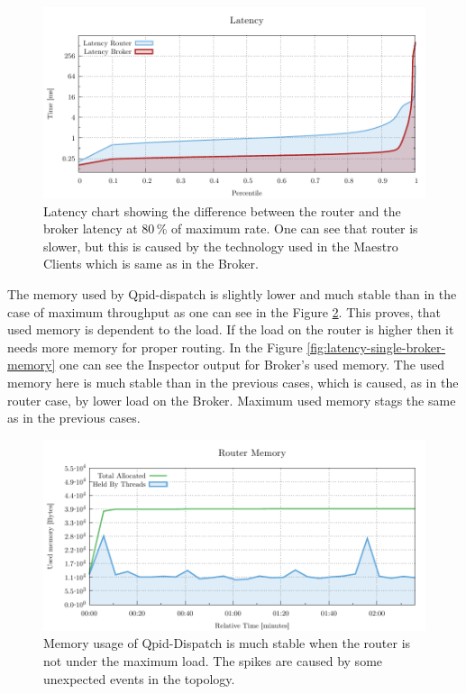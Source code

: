 \begin{figure}[H]
	\centering
	\includegraphics[width=1\linewidth]{obrazky-figures/charts/singlepoint-latency.pdf}
	\caption{Latency chart showing the difference between the router and the broker latency at 80\,\% of maximum rate. One can see that router is slower, but this is caused by the technology used in the Maestro Clients which is same as in the Broker.}
	\label{fig:latency-single-router}
\end{figure}

The memory used by Qpid-dispatch is slightly lower and much stable than in the case of maximum throughput as one can see in the Figure \ref{fig:latency-single-router-memory}. This proves, that used memory is dependent to the load. If the load on the router is higher then it needs more memory for proper routing. In the Figure \ref{fig:latency-single-broker-memory} one can see the Inspector output for Broker's used memory. The used memory here is much stable than in the previous cases, which is caused, as in the router case, by lower load on the Broker. Maximum used memory stags the same as in the previous cases.

\begin{figure}[H]
	\centering
	\includegraphics[width=1\linewidth]{obrazky-figures/charts/singlepoint-router-latency-memory.pdf}
	\caption{Memory usage of Qpid-Dispatch is much stable when the router is not under the maximum load. The spikes are caused by some unexpected events in the topology.}
	\label{fig:latency-single-router-memory}
\end{figure}

